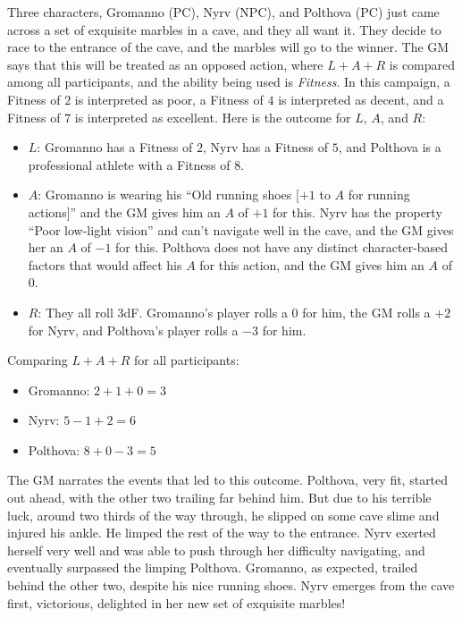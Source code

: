 \begin{example}
Three characters, Gromanno (PC), Nyrv (NPC), and Polthova (PC) just came across a set of exquisite marbles in a cave, and they all want it.
They decide to race to the entrance of the cave, and the marbles will go to the winner.
The GM says that this will be treated as an opposed action,
where $L+A+R$ is compared among all participants, and the ability being used is \emph{Fitness}.
In this campaign,
a Fitness of $2$ is interpreted as poor,
a Fitness of $4$ is interpreted as decent,
and a Fitness of $7$ is interpreted as excellent.
Here is the outcome for $L$, $A$, and $R$:
\begin{itemize}
\item
$L$: Gromanno has a Fitness of $2$, Nyrv has a Fitness of $5$, and Polthova is a professional athlete with a Fitness of $8$.
\item
$A$: Gromanno is wearing his ``Old running shoes [$+1$ to $A$ for running actions]'' and the GM gives him an $A$ of $+1$ for this.
Nyrv has the property ``Poor low-light vision'' and can’t navigate well in the cave, and the GM gives her an $A$ of $-1$ for this.
Polthova does not have any distinct character-based factors that would affect his $A$ for this action, and the GM gives him an $A$ of 0.
\item
$R$: They all roll $3$dF.
Gromanno’s player rolls a $0$ for him, the GM rolls a $+2$ for Nyrv, and Polthova’s player rolls a $-3$ for him.
\end{itemize}
Comparing $L+A+R$ for all participants:
\begin{itemize}
\item Gromanno: $2+1+0 = 3$
\item Nyrv: $5-1+2 = 6$
\item Polthova: $8+0-3 = 5$
\end{itemize}
The GM narrates the events that led to this outcome.
Polthova, very fit, started out ahead, with the other two trailing far behind him.
But due to his terrible luck, around two thirds of the way through, he slipped on some cave slime and injured his ankle.
He limped the rest of the way to the entrance.
Nyrv exerted herself very well and was able to push through her difficulty navigating, and eventually surpassed the limping Polthova.
Gromanno, as expected, trailed behind the other two, despite his nice running shoes.
Nyrv emerges from the cave first, victorious, delighted in her new set of exquisite marbles!
\end{example}


